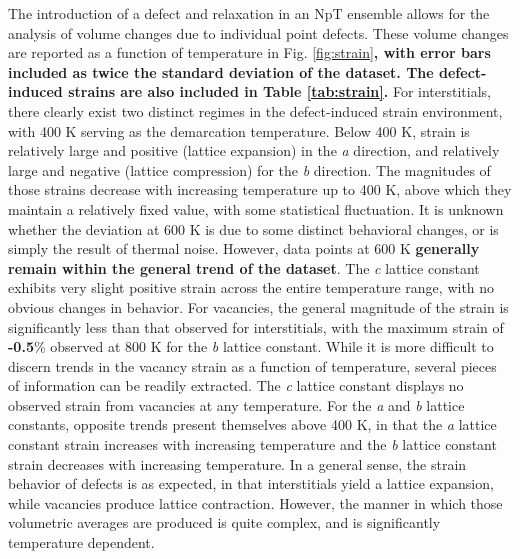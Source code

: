 \documentclass[utf8]{frontiersSCNS} %
\providecommand{\DIFaddtex}[1]{{\bf #1}} %
\providecommand{\DIFdeltex}[1]{} %
\providecommand{\DIFaddbegin}{\protect\color{blue}} %
\providecommand{\DIFaddend}{\protect\color{black}} %
\providecommand{\DIFdelbegin}{\protect\color{red}} %
\providecommand{\DIFdelend}{\protect\color{black}} %
\providecommand{\DIFadd}[1]{\texorpdfstring{\DIFaddtex{#1}}{#1}} %
\providecommand{\DIFdel}[1]{\texorpdfstring{\DIFdeltex{#1}}{}} %
\begin{document}
The introduction of a defect and relaxation in an NpT ensemble allows for the analysis of volume changes due to individual point defects. These volume changes are reported as a function of temperature in Fig. \ref{fig:strain}\DIFdelbegin \DIFdel{. }\DIFdelend \DIFaddbegin \DIFadd{, with error bars included as twice the standard deviation of the dataset. The defect-induced strains are also included in Table \ref{tab:strain}. }\DIFaddend For interstitials, there clearly exist two distinct regimes in the defect-induced strain environment, with 400 K serving as the demarcation temperature. Below 400 K, strain is relatively large and positive (lattice expansion) in the \textit{a} direction, and relatively large and negative (lattice compression) for the \textit{b} direction. The magnitudes of those strains decrease with increasing temperature up to 400 K, above which they maintain a relatively fixed value, with some statistical fluctuation. It is unknown whether the deviation at 600 K is due to some distinct behavioral changes, or is simply the result of thermal noise. However, data points at 600 K \DIFdelbegin \DIFdel{remains within the standard error of the general trend (standard error not shown here for readability of figures), which implies that it is unlikely to indicate a change in behavior}\DIFdelend \DIFaddbegin \DIFadd{generally remain within the general trend of the dataset}\DIFaddend . The \textit{c} lattice constant exhibits very slight positive strain across the entire temperature range, with no obvious changes in behavior. For vacancies, the general magnitude of the strain is significantly less than that observed for interstitials, with the maximum strain of \DIFdelbegin \DIFdel{0.5}\DIFdelend \DIFaddbegin \DIFadd{-0.5}\DIFaddend \% observed at 800 K for the \textit{b} lattice constant. While it is more difficult to discern trends in the vacancy strain as a function of temperature, several pieces of information can be readily extracted. The \textit{c} lattice constant displays no observed strain from vacancies at any temperature. For the \textit{a} and \textit{b} lattice constants, opposite trends present themselves above 400 K, in that the \textit{a} lattice constant strain increases with increasing temperature and the \textit{b} lattice constant strain decreases with increasing temperature. In a general sense, the strain behavior of defects is as expected, in that interstitials yield a lattice expansion, while vacancies produce lattice contraction. However, the manner in which those volumetric averages are produced is quite complex, and is significantly temperature dependent. 
\end{document}

